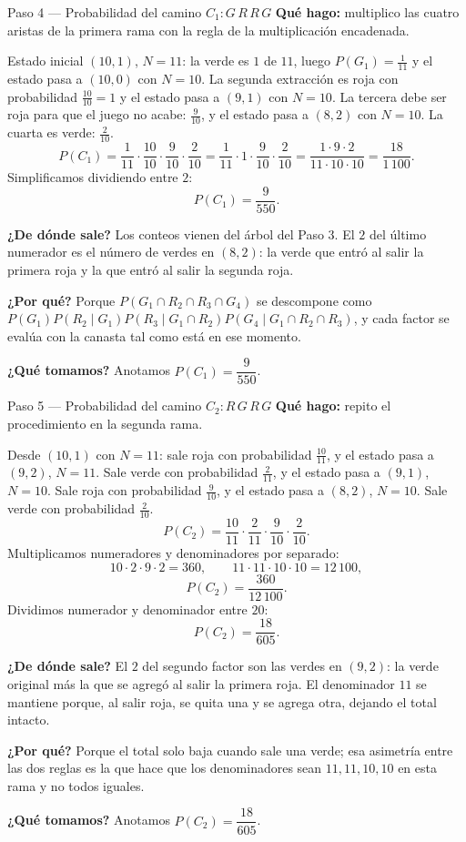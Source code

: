 \documentclass[11pt]{article}
\begin{document}
\begin{paso}{Paso 4 --- Probabilidad del camino $C_1: G\,R\,R\,G$}
\textbf{Qué hago:} multiplico las cuatro aristas de la primera rama con la regla de la multiplicación encadenada.

Estado inicial $(10,1)$, $N=11$: la verde es $1$ de $11$, luego $P(G_1)=\tfrac{1}{11}$ y el estado pasa a $(10,0)$ con $N=10$. La segunda extracción es roja con probabilidad $\tfrac{10}{10}=1$ y el estado pasa a $(9,1)$ con $N=10$. La tercera debe ser roja para que el juego no acabe: $\tfrac{9}{10}$, y el estado pasa a $(8,2)$ con $N=10$. La cuarta es verde: $\tfrac{2}{10}$.
\[
P(C_1)=\frac{1}{11}\cdot\frac{10}{10}\cdot\frac{9}{10}\cdot\frac{2}{10}
=\frac{1}{11}\cdot 1\cdot\frac{9}{10}\cdot\frac{2}{10}
=\frac{1\cdot 9\cdot 2}{11\cdot 10\cdot 10}
=\frac{18}{1\,100}.
\]
Simplificamos dividiendo entre $2$:
\[
P(C_1)=\frac{9}{550}.
\]

\textbf{¿De dónde sale?} Los conteos vienen del árbol del Paso 3. El $2$ del último numerador es el número de verdes en $(8,2)$: la verde que entró al salir la primera roja y la que entró al salir la segunda roja.

\textbf{¿Por qué?} Porque $P(G_1\cap R_2\cap R_3\cap G_4)$ se descompone como $P(G_1)P(R_2\mid G_1)P(R_3\mid G_1\cap R_2)P(G_4\mid G_1\cap R_2\cap R_3)$, y cada factor se evalúa con la canasta tal como está en ese momento.

\textbf{¿Qué tomamos?} Anotamos $P(C_1)=\dfrac{9}{550}$.
\end{paso}

\begin{paso}{Paso 5 --- Probabilidad del camino $C_2: R\,G\,R\,G$}
\textbf{Qué hago:} repito el procedimiento en la segunda rama.

Desde $(10,1)$ con $N=11$: sale roja con probabilidad $\tfrac{10}{11}$, y el estado pasa a $(9,2)$, $N=11$. Sale verde con probabilidad $\tfrac{2}{11}$, y el estado pasa a $(9,1)$, $N=10$. Sale roja con probabilidad $\tfrac{9}{10}$, y el estado pasa a $(8,2)$, $N=10$. Sale verde con probabilidad $\tfrac{2}{10}$.
\[
P(C_2)=\frac{10}{11}\cdot\frac{2}{11}\cdot\frac{9}{10}\cdot\frac{2}{10}.
\]
Multiplicamos numeradores y denominadores por separado:
\[
10\cdot 2\cdot 9\cdot 2=360,
\qquad
11\cdot 11\cdot 10\cdot 10=12\,100,
\]
\[
P(C_2)=\frac{360}{12\,100}.
\]
Dividimos numerador y denominador entre $20$:
\[
P(C_2)=\frac{18}{605}.
\]

\textbf{¿De dónde sale?} El $2$ del segundo factor son las verdes en $(9,2)$: la verde original más la que se agregó al salir la primera roja. El denominador $11$ se mantiene porque, al salir roja, se quita una y se agrega otra, dejando el total intacto.

\textbf{¿Por qué?} Porque el total solo baja cuando sale una verde; esa asimetría entre las dos reglas es la que hace que los denominadores sean $11,11,10,10$ en esta rama y no todos iguales.

\textbf{¿Qué tomamos?} Anotamos $P(C_2)=\dfrac{18}{605}$.
\end{paso}
\end{document}
